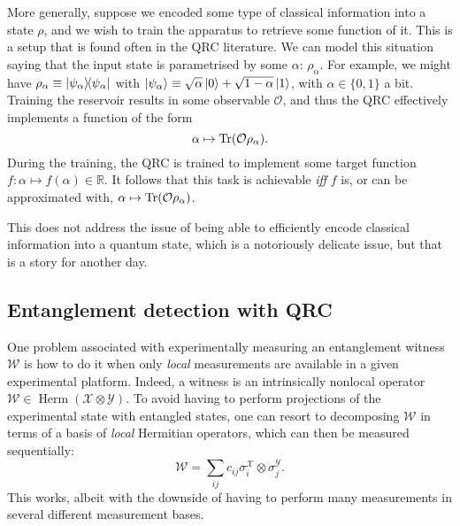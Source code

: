 \documentclass[12pt]{report}
\newcommand{\RR}{\mathbb{R}}
\newcommand{\calY}{{\mathcal{Y}}}
\newcommand{\calO}{{\mathcal{O}}}
\newcommand{\calW}{{\mathcal{W}}}
\newcommand{\calX}{{\mathcal{X}}}
\DeclareMathOperator{\Herm}{Herm}
\begin{document}
More generally, suppose we encoded some type of classical information into a state $\rho$, and we wish to train the apparatus to retrieve some function of it. This is a setup that is found often in the QRC literature.
We can model this situation saying that the input state is parametrised by some $\alpha$: $\rho_\alpha$.
For example, we might have $\rho_\alpha\equiv\ketbra{\psi_\alpha}{\psi_\alpha}$ with $\ket{\psi_\alpha}\equiv \sqrt{\alpha}\ket0+\sqrt{1-\alpha}\ket1$, with $\alpha\in\{0,1\}$ a bit.
Training the reservoir results in some observable $\calO$, and thus the QRC effectively implements a function of the form
\begin{equation}
	\alpha\mapsto \Tr(\calO\rho_\alpha).
\end{equation}
During the training, the QRC is trained to implement some target function $f:\alpha\mapsto f(\alpha)\in\RR$.
It follows that this task is achievable \emph{iff} $f$ is, or can be approximated with, $\alpha\mapsto \Tr(\calO\rho_\alpha)$.

This does not address the issue of being able to efficiently encode classical information into a quantum state, which is a notoriously delicate issue, but that is a story for another day.


\subsection{Entanglement detection with QRC}

One problem associated with experimentally measuring an entanglement witness $\calW$ is how to do it when only \emph{local} measurements are available in a given experimental platform.
Indeed, a witness is an intrinsically nonlocal operator $\calW\in\Herm(\calX\otimes\calY)$.
To avoid having to perform projections of the experimental state with entangled states, one can resort to decomposing $\calW$ in terms of a basis of \emph{local} Hermitian operators, which can then be measured sequentially:
\begin{equation}
	\calW = \sum_{ij} c_{ij} \sigma_i^\calX\otimes\sigma_j^\calY.
\end{equation}
This works, albeit with the downside of having to perform many measurements in several different measurement bases.


\end{document}
